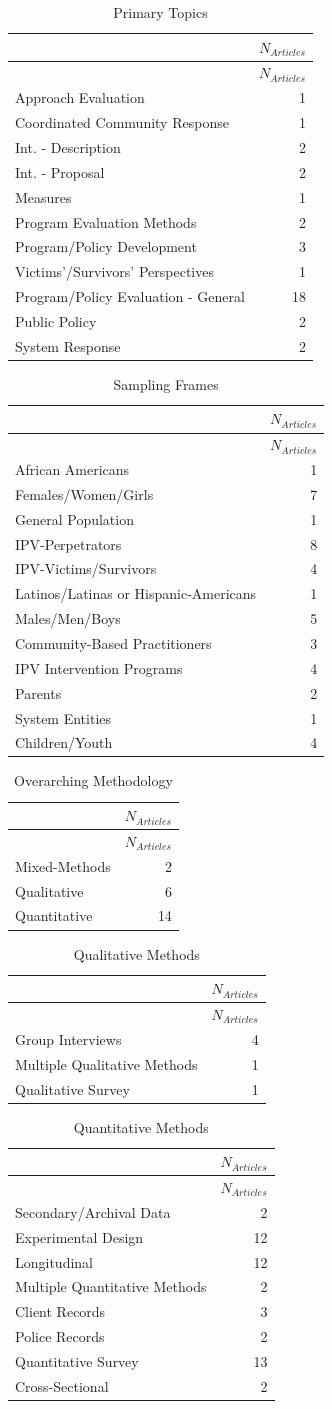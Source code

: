 \documentclass[]{tufte-handout}
\begin{document}
\begin{longtable}[]{@{}lr@{}}
\caption{Primary Topics}\tabularnewline
\toprule
& \(N_{Articles}\)\tabularnewline
\midrule
\endfirsthead
\toprule
& \(N_{Articles}\)\tabularnewline
\midrule
\endhead
Approach Evaluation & 1\tabularnewline
Coordinated Community Response & 1\tabularnewline
Int. - Description & 2\tabularnewline
Int. - Proposal & 2\tabularnewline
Measures & 1\tabularnewline
Program Evaluation Methods & 2\tabularnewline
Program/Policy Development & 3\tabularnewline
Victims'/Survivors' Perspectives & 1\tabularnewline
Program/Policy Evaluation - General & 18\tabularnewline
Public Policy & 2\tabularnewline
System Response & 2\tabularnewline
\bottomrule
\end{longtable}

\begin{longtable}[]{@{}lr@{}}
\caption{Sampling Frames}\tabularnewline
\toprule
& \(N_{Articles}\)\tabularnewline
\midrule
\endfirsthead
\toprule
& \(N_{Articles}\)\tabularnewline
\midrule
\endhead
African Americans & 1\tabularnewline
Females/Women/Girls & 7\tabularnewline
General Population & 1\tabularnewline
IPV-Perpetrators & 8\tabularnewline
IPV-Victims/Survivors & 4\tabularnewline
Latinos/Latinas or Hispanic-Americans & 1\tabularnewline
Males/Men/Boys & 5\tabularnewline
Community-Based Practitioners & 3\tabularnewline
IPV Intervention Programs & 4\tabularnewline
Parents & 2\tabularnewline
System Entities & 1\tabularnewline
Children/Youth & 4\tabularnewline
\bottomrule
\end{longtable}

\begin{longtable}[]{@{}lr@{}}
\caption{Overarching Methodology}\tabularnewline
\toprule
& \(N_{Articles}\)\tabularnewline
\midrule
\endfirsthead
\toprule
& \(N_{Articles}\)\tabularnewline
\midrule
\endhead
Mixed-Methods & 2\tabularnewline
Qualitative & 6\tabularnewline
Quantitative & 14\tabularnewline
\bottomrule
\end{longtable}

\begin{longtable}[]{@{}lr@{}}
\caption{Qualitative Methods}\tabularnewline
\toprule
& \(N_{Articles}\)\tabularnewline
\midrule
\endfirsthead
\toprule
& \(N_{Articles}\)\tabularnewline
\midrule
\endhead
Group Interviews & 4\tabularnewline
Multiple Qualitative Methods & 1\tabularnewline
Qualitative Survey & 1\tabularnewline
\bottomrule
\end{longtable}

\begin{longtable}[]{@{}lr@{}}
\caption{Quantitative Methods}\tabularnewline
\toprule
& \(N_{Articles}\)\tabularnewline
\midrule
\endfirsthead
\toprule
& \(N_{Articles}\)\tabularnewline
\midrule
\endhead
Secondary/Archival Data & 2\tabularnewline
Experimental Design & 12\tabularnewline
Longitudinal & 12\tabularnewline
Multiple Quantitative Methods & 2\tabularnewline
Client Records & 3\tabularnewline
Police Records & 2\tabularnewline
Quantitative Survey & 13\tabularnewline
Cross-Sectional & 2\tabularnewline
\bottomrule
\end{longtable}
\end{document}
